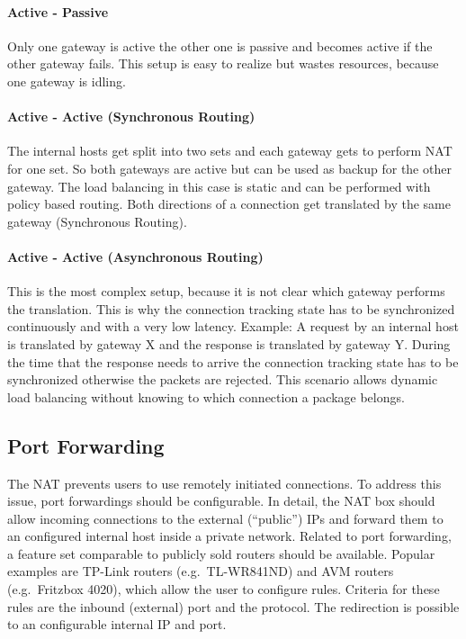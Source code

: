 \documentclass{report}
\begin{document}
\paragraph{Active - Passive}

Only one gateway is active the other one is passive and becomes active
if the other gateway fails. This setup is easy to realize but wastes
resources, because one gateway is idling.

\paragraph{Active - Active (Synchronous Routing)}

The internal hosts get split into two sets and each gateway gets to
perform NAT for one set. So both gateways are active but can be used as
backup for the other gateway. The load balancing in this case is static
and can be performed with policy based routing. Both directions of a
connection get translated by the same gateway (Synchronous Routing).

\paragraph{Active - Active (Asynchronous Routing)}

This is the most complex setup, because it is not clear which gateway
performs the translation. This is why the connection tracking state has
to be synchronized continuously and with a very low latency. Example: A
request by an internal host is translated by gateway X and the response
is translated by gateway Y. During the time that the response needs to
arrive the connection tracking state has to be synchronized otherwise
the packets are rejected. This scenario allows dynamic load balancing
without knowing to which connection a package belongs.


\subsection{Port Forwarding}\label{port-forwarding}

The NAT prevents users to use remotely initiated connections. To address
this issue, port forwardings should be configurable. In detail, the NAT
box should allow incoming connections to the external (``public'') IPs
and forward them to an configured internal host inside a private
network. Related to port forwarding, a feature set comparable to
publicly sold routers should be available. Popular examples are TP-Link
routers (e.g.~TL-WR841ND\cite{TL-WR}) and AVM routers (e.g.~Fritzbox 4020\cite{fritzbox}), which
allow the user to configure rules. Criteria for these rules are the
inbound (external) port and the protocol. The redirection is possible to
an configurable internal IP and port.
\end{document}
